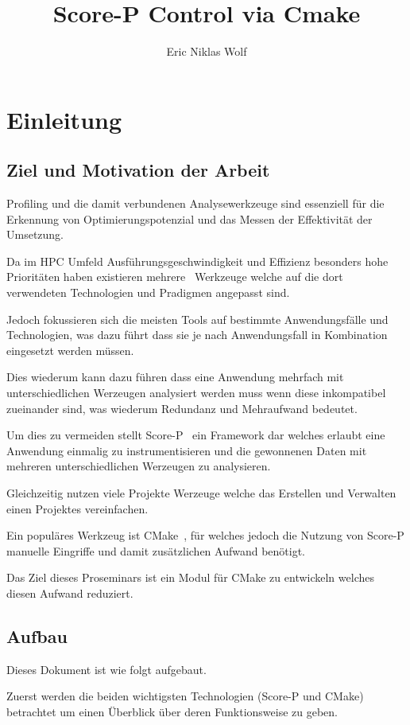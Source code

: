 \documentclass[german,proseminar,hyperref,utf8]{zihpub}
\author{Eric Niklas Wolf}
\title{Score-P Control via Cmake}
\begin{document}
    \section{Einleitung}
    \subsection{Ziel und Motivation der Arbeit}
    Profiling und die damit verbundenen Analysewerkzeuge sind essenziell für die Erkennung von
    Optimierungspotenzial und das Messen der Effektivität der Umsetzung.

    Da im HPC Umfeld Ausführungsgeschwindigkeit und Effizienz besonders hohe Prioritäten haben existieren
    mehrere~ Werkzeuge welche auf die dort verwendeten Technologien
    und Pradigmen angepasst sind.

    Jedoch fokussieren sich die meisten Tools auf bestimmte Anwendungsfälle und Technologien,
    was dazu führt dass sie je nach Anwendungsfall in Kombination eingesetzt werden müssen.

    Dies wiederum kann dazu führen dass eine Anwendung mehrfach mit unterschiedlichen Werzeugen
    analysiert werden muss wenn diese inkompatibel zueinander sind, was wiederum Redundanz
    und Mehraufwand bedeutet.

    Um dies zu vermeiden stellt Score-P~\cite{Score-P-Paper} ein Framework dar welches erlaubt
    eine Anwendung  einmalig zu instrumentisieren und die gewonnenen Daten mit mehreren
    unterschiedlichen Werzeugen zu analysieren.

    Gleichzeitig nutzen viele Projekte Werzeuge welche das Erstellen und Verwalten einen Projektes
    vereinfachen.

    Ein populäres Werkzeug ist CMake~\cite{CMake-Documentation}, für welches jedoch die Nutzung
    von Score-P manuelle Eingriffe und damit zusätzlichen Aufwand benötigt.

    Das Ziel dieses Proseminars ist ein Modul für CMake zu entwickeln welches diesen Aufwand
    reduziert.


    \subsection{Aufbau}
    Dieses Dokument ist wie folgt aufgebaut.

    Zuerst werden die beiden wichtigsten Technologien (Score-P und CMake) betrachtet um einen
    Überblick über deren Funktionsweise zu geben.
\end{document}
